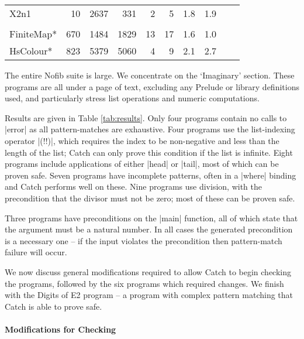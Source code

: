 \documentclass[preprint]{sigplanconf}
\begin{document}
\begin{table}
\begin{tabular*}{\linewidth}{lrrrrrrlll}
\hspace{-2mm} X2n1                         & 10 & 2637 &  331 & 2 &  5 & 1.8 & 1.9 \\
\vspace{-1ex} \\
\hspace{-2mm} FiniteMap*    \hspace{-3mm} & 670 & 1484 & 1829 & 13 & 17 & 1.6 & 1.0 \\
\hspace{-2mm} HsColour*     \hspace{-3mm} & 823 & 5379 & 5060 & 4 &  9 & 2.1 & 2.7 \\
\hline
\end{tabular*}
\end{table}

The entire Nofib suite \cite{nofib} is large. We concentrate on the `Imaginary' section. These programs are all under a page of text, excluding any Prelude or library definitions used, and particularly stress list operations and numeric computations.

Results are given in Table \ref{tab:results}. Only four programs contain no calls to |error| as all pattern-matches are exhaustive. Four programs use the list-indexing operator |(!!)|, which requires the index to be non-negative and less than the length of the list; Catch can only prove this condition if the list is infinite. Eight programs include applications of either |head| or |tail|, most of which can be proven safe. Seven programs have incomplete patterns, often in a |where| binding and Catch performs well on these. Nine programs use division, with the precondition that the divisor must not be zero; most of these can be proven safe.

Three programs have preconditions on the |main| function, all of which state that the argument must be a natural number. In all cases the generated precondition is a necessary one -- if the input violates the precondition then pattern-match failure will occur.

We now discuss general modifications required to allow Catch to begin checking the programs, followed by the six programs which required changes. We finish with the Digits of E2 program -- a program with complex pattern matching that Catch is able to prove safe.

\paragraph{Modifications for Checking}
\end{document}
